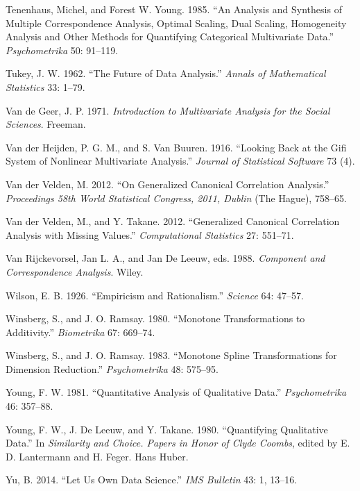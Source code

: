 \documentclass[
  12pt,
  letterpaper,
  DIV=11,
  numbers=noendperiod]{scrreprt}
\newlength{\cslhangindent}
\newenvironment{CSLReferences}[2] %
 {\begin{list}{}{%
  \setlength{\itemindent}{0pt}
  \setlength{\leftmargin}{0pt}
  \setlength{\parsep}{0pt}
  \ifodd #1
   \setlength{\leftmargin}{\cslhangindent}
   \setlength{\itemindent}{-1\cslhangindent}
  \fi
  \setlength{\itemsep}{#2\baselineskip}}}
 {\end{list}}
\begin{document}
\begin{CSLReferences}{1}{1}
Tenenhaus, Michel, and Forest W. Young. 1985. {``{An Analysis and
Synthesis of Multiple Correspondence Analysis, Optimal Scaling, Dual
Scaling, Homogeneity Analysis and Other Methods for Quantifying
Categorical Multivariate Data}.''} \emph{Psychometrika} 50: 91--119.

Tukey, J. W. 1962. {``{The Future of Data Analysis}.''} \emph{Annals of
Mathematical Statistics} 33: 1--79.

Van de Geer, J. P. 1971. \emph{{Introduction to Multivariate Analysis
for the Social Sciences}}. Freeman.

Van der Heijden, P. G. M., and S. Van Buuren. 1916. {``Looking Back at
the Gifi System of Nonlinear Multivariate Analysis.''} \emph{Journal of
Statistical Software} 73 (4).

Van der Velden, M. 2012. {``On Generalized Canonical Correlation
Analysis.''} \emph{Proceedings 58th World Statistical Congress, 2011,
Dublin} (The Hague), 758--65.

Van der Velden, M., and Y. Takane. 2012. {``{Generalized Canonical
Correlation Analysis with Missing Values}.''} \emph{Computational
Statistics} 27: 551--71.

Van Rijckevorsel, Jan L. A., and Jan De Leeuw, eds. 1988.
\emph{Component and Correspondence Analysis}. Wiley.

Wilson, E. B. 1926. {``{Empiricism and Rationalism}.''} \emph{Science}
64: 47--57.

Winsberg, S., and J. O. Ramsay. 1980. {``{Monotone Transformations to
Additivity}.''} \emph{Biometrika} 67: 669--74.

Winsberg, S., and J. O. Ramsay. 1983. {``{Monotone Spline
Transformations for Dimension Reduction}.''} \emph{Psychometrika} 48:
575--95.

Young, F. W. 1981. {``{Quantitative Analysis of Qualitative Data}.''}
\emph{Psychometrika} 46: 357--88.

Young, F. W., J. De Leeuw, and Y. Takane. 1980. {``Quantifying
Qualitative Data.''} In \emph{Similarity and Choice. Papers in Honor of
Clyde Coombs}, edited by E. D. Lantermann and H. Feger. Hans Huber.

Yu, B. 2014. {``{Let Us Own Data Science}.''} \emph{IMS Bulletin} 43: 1,
13--16.

\end{CSLReferences}
\end{document}

